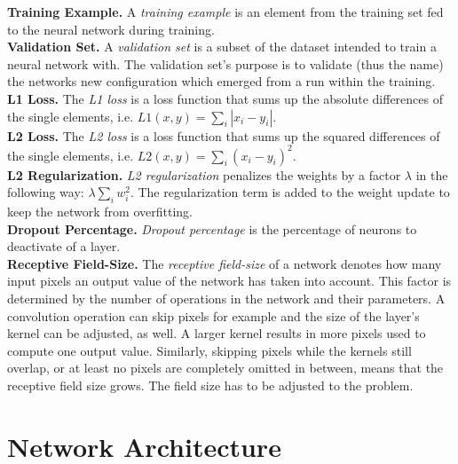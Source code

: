 \noindent\textbf{Training Example.} A \textit{training example} is an element from the training set fed to the neural network during training. \\

\noindent\textbf{Validation Set.} A \textit{validation set} is a subset of the dataset intended to train a neural network with. The validation set's purpose is to validate (thus the name) the networks new configuration which emerged from a run within the training. \\

\noindent\textbf{L1 Loss.} The \textit{L1 loss} is a loss function that sums up the absolute differences of the single elements, i.e. $L1(x, y) = \sum\limits_i |x_i - y_i|$. \\

\noindent\textbf{L2 Loss.} The \textit{L2 loss} is a loss function that sums up the squared differences of the single elements, i.e. $L2(x, y) = \sum\limits_i (x_i - y_i)^2$. \\

\noindent\textbf{L2 Regularization.} \textit{L2 regularization} penalizes the weights by a factor $\lambda$ in the following way: $\lambda \sum\limits_i w_i^2$. The regularization term is added to the weight update to keep the network from overfitting. \\

\noindent\textbf{Dropout Percentage.} \textit{Dropout percentage} is the percentage of neurons to deactivate of a layer. \\

\noindent\textbf{Receptive Field-Size.} The \textit{receptive field-size} of a network denotes how many input pixels an output value of the network has taken into account. This factor is determined by the number of operations in the network and their parameters. A convolution operation can skip pixels for example and the size of the layer's kernel can be adjusted, as well. A larger kernel results in more pixels used to compute one output value. Similarly, skipping pixels while the kernels still overlap, or at least no pixels are completely omitted in between, means that the receptive field size grows. The field size has to be adjusted to the problem.

\section{Network Architecture}


